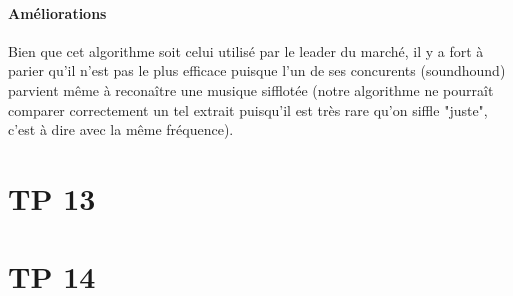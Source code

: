 \documentclass{article}
\begin{document}
\paragraph{Améliorations}
Bien que cet algorithme soit celui utilisé par le leader du marché, il y a
fort à parier qu'il n'est pas le plus efficace puisque l'un de ses
concurents (soundhound) parvient même à reconaître une musique
sifflotée (notre algorithme ne pourraît comparer correctement un tel
extrait puisqu'il est très rare qu'on siffle "juste", c'est à dire avec
la même fréquence).

\section{TP 13}
\section{TP 14}
\end{document}
